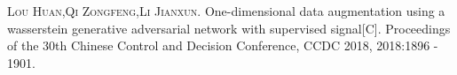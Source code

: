
\begin{publications}{99}
	\item\textsc{Lou Huan,Qi Zongfeng,Li Jianxun}. {One-dimensional data augmentation using a wasserstein generative adversarial network with supervised signal}[C]. Proceedings of the 30th Chinese Control and Decision Conference, CCDC 2018, 2018:1896 - 1901.
\end{publications}
